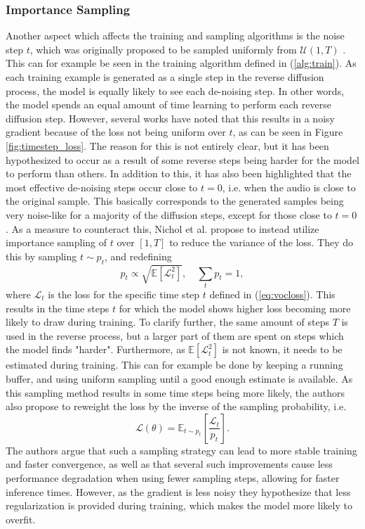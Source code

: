 \documentclass{report}
\begin{document}
\subsubsection{Importance Sampling}
Another aspect which affects the training and sampling algorithms is the noise step $t$, which was originally proposed to be sampled uniformly from $\mathcal{U}(1, T)$ \cite{ho2020denoising}. This can for example be seen in the training algorithm defined in (\ref{alg:train}). As each training example is generated as a single step in the reverse diffusion process, the model is equally likely to see each de-noising step. In other words, the model spends an equal amount of time learning to perform each reverse diffusion step. However, several works have noted that this results in a noisy gradient because of the loss not being uniform over $t$, as can be seen in Figure \ref{fig:timestep_loss}. The reason for this is not entirely clear, but it has been hypothesized to occur as a result of some reverse steps being harder for the model to perform than others. In addition to this, it has also been highlighted that the most effective de-noising steps occur close to $t=0$, i.e. when the audio is close to the original sample. This basically corresponds to the generated samples being very noise-like for a majority of the diffusion steps, except for those close to $t=0$ \cite{kong2020diffwave, nichol2021improved}. As a measure to counteract this, Nichol et al. propose to instead utilize importance sampling of $t$ over $[1, T]$ to reduce the variance of the loss. They do this by sampling $t\sim p_t$, and redefining
\begin{equation} \label{eq:weighted}
    p_t \propto \sqrt{\mathbb{E}\left[ \mathcal{L}_{t}^2 \right] }, \quad \sum_t p_t = 1, 
\end{equation}
where $\mathcal{L}_{t}$ is the loss for the specific time step $t$ defined in (\ref{eq:vocloss}). This results in the time steps $t$ for which the model shows higher loss becoming more likely to draw during training. To clarify further, the same amount of steps $T$ is used in the reverse process, but a larger part of them are spent on steps which the model finds "harder". Furthermore, as $\mathbb{E}[\mathcal{L}_t^2]$ is not known, it needs to be estimated during training. This can for example be done by keeping a running buffer, and using uniform sampling until a good enough estimate is available. As this sampling method results in some time steps being more likely, the authors also propose to reweight the loss by the inverse of the sampling probability, i.e. 
\begin{equation}
    \mathcal{L}(\theta) = \mathbb{E}_{t \sim p_t} \left[ \frac{\mathcal{L}_{t}}{p_t} \right].
\end{equation}
The authors argue that such a sampling strategy can lead to more stable training and faster convergence, as well as that several such improvements cause less performance degradation when using fewer sampling steps, allowing for faster inference times. However, as the gradient is less noisy they hypothesize that less regularization is provided during training, which makes the model more likely to overfit.
\end{document}
